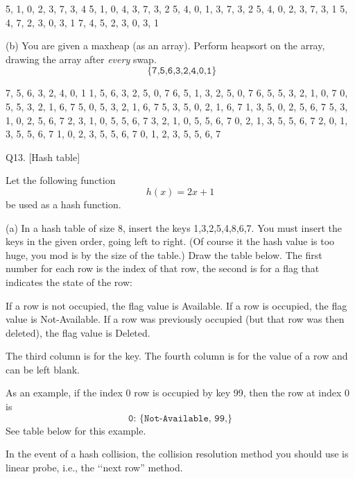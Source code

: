 \ANSWER
\begin{answercode}
{5, 1, 0, 2, 3, 7, 3, 4}
{5, 1, 0, 4, 3, 7, 3, 2}
{5, 4, 0, 1, 3, 7, 3, 2}
{5, 4, 0, 2, 3, 7, 3, 1}
{5, 4, 7, 2, 3, 0, 3, 1}
{7, 4, 5, 2, 3, 0, 3, 1}
\end{answercode}


\newpage
(b) You are given a maxheap (as an array). Perform heapsort on the array,
drawing the array after \textit{every} swap.
\[
\texttt{ \{7,5,6,3,2,4,0,1\} }
\]

\ANSWER
\begin{answercode}
{7, 5, 6, 3, 2, 4, 0, 1}
{1, 5, 6, 3, 2, 5, 0, 7}
{6, 5, 1, 3, 2, 5, 0, 7}
{6, 5, 5, 3, 2, 1, 0, 7}
{0, 5, 5, 3, 2, 1, 6, 7}
{5, 0, 5, 3, 2, 1, 6, 7}
{5, 3, 5, 0, 2, 1, 6, 7}
{1, 3, 5, 0, 2, 5, 6, 7}
{5, 3, 1, 0, 2, 5, 6, 7}
{2, 3, 1, 0, 5, 5, 6, 7}
{3, 2, 1, 0, 5, 5, 6, 7}
{0, 2, 1, 3, 5, 5, 6, 7}
{2, 0, 1, 3, 5, 5, 6, 7}
{1, 0, 2, 3, 5, 5, 6, 7}
{0, 1, 2, 3, 5, 5, 6, 7}
\end{answercode}





\newpage
Q13. [Hash table]

Let the following function
\[
h(x) = 2 x + 1
\]
be used as a hash function.

(a)
In a hash table of size 8, insert the keys
1,3,2,5,4,8,6,7.
You must insert the keys in the given order, going left to right.
(Of course it the hash value is too huge, you mod is by the size of the table.)
Draw the table below.
The first number for each row is the index of that row,
the second is for a flag that indicates the state of the row:
\begin{tightlist}
  \li If a row is not occupied, the flag value is Available.
  \li If a row is occupied, the flag value is Not-Available.
  \li If a row was previously occupied (but that row was then deleted),
  the flag value is Deleted.
\end{tightlist}
The third column is for the key.
The fourth column is for the value of a row and can be left blank.

As an example, if the index 0 row is occupied by key 99, then
the row at index 0 is
\[
\texttt{0:\ \{Not-Available, 99,\}}
\]
See table below for this example.

In the event of a hash collision, the collision resolution method you should
use is linear probe, i.e., the \lq\lq next row'' method.

